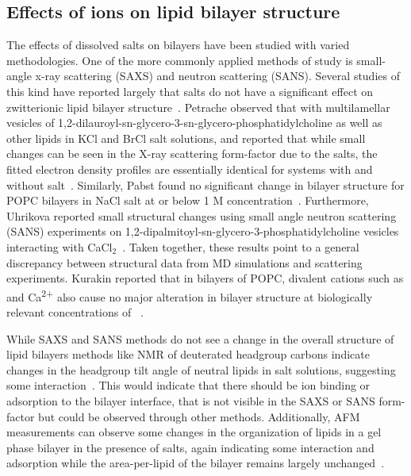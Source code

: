 \subsection{Effects of ions on lipid bilayer structure}
The effects of dissolved salts on bilayers have been studied with varied methodologies. 
One of the more commonly applied methods of study
is small-angle x-ray scattering (SAXS) and neutron scattering (SANS). 
Several studies of this kind have reported
largely that salts do not have a significant effect on zwitterionic lipid bilayer 
structure~\cite{pabst:2007,petrache:2006:swelling,uhrikova:2008,kurakin:2021:effect}.
Petrache \etal{} observed that with multilamellar vesicles of 1,2-dilauroyl-sn-glycero-3-sn-glycero-phosphatidylcholine 
as well as other lipids in KCl and BrCl salt solutions, 
and reported that while small changes can be seen in the
X-ray scattering form-factor due to the 
salts, 
the fitted electron density profiles are essentially identical for
systems with and without 
salt~\cite{petrache:2006:swelling}. 
Similarly, Pabst \etal{} found no significant change in bilayer structure 
for POPC bilayers in NaCl salt at or below 1 M concentration~\cite{pabst:2007}.
Furthermore, Uhrikova \etal{} reported small structural changes using small angle neutron scattering
(SANS) experiments on 1,2-dipalmitoyl-sn-glycero-3-phosphatidylcholine 
vesicles interacting with CaCl$_{2}$~\cite{uhrikova:2008}. 
Taken together, these results point to a general discrepancy between structural data 
from MD simulations and scattering experiments.
Kurakin \etal{} reported that in bilayers of POPC, divalent cations such as \mg{} and Ca\textsuperscript{2+} also cause
no major alteration in bilayer structure at biologically relevant concentrations of \mg~\cite{kurakin:2021:effect}.

While SAXS and SANS methods do not see a change in the overall structure of lipid bilayers methods like NMR of deuterated headgroup carbons 
indicate changes in the headgroup tilt angle of neutral lipids in salt solutions, suggesting some interaction~\cite{akutsu:1981,seelig:1987,seelig:1977}. 
This would indicate that there should be ion binding or adsorption to the bilayer interface, that is not visible in the SAXS or SANS form-factor but 
could be observed through other methods. Additionally, AFM measurements can observe some changes in the organization of lipids in a 
gel phase bilayer in the presence of salts, again indicating some interaction 
and adsorption while the area-per-lipid of the bilayer remains largely unchanged~\cite{ferber:2011:direct}.

